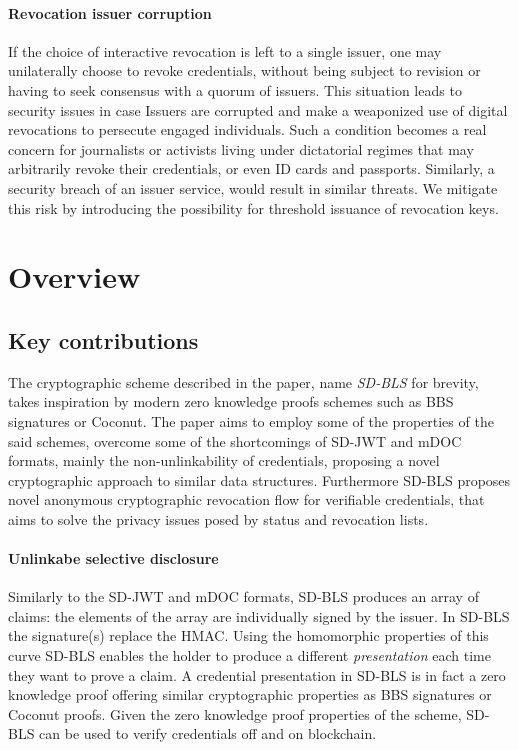 

\paragraph{Revocation issuer corruption}

If the choice of interactive revocation is left to a single issuer, one may unilaterally choose to revoke credentials, without being subject to revision or having to seek consensus with a quorum of issuers. This situation leads to security issues in case Issuers are corrupted and make a weaponized use of digital revocations to persecute engaged individuals. Such a condition becomes a real concern for journalists or activists living under dictatorial regimes that may arbitrarily revoke their credentials, or even ID cards and passports. Similarly, a security breach of an issuer service, would result in similar threats. We mitigate this risk by introducing the possibility for threshold issuance of revocation keys.

\section{Overview}

\subsection{Key contributions}
The  cryptographic scheme described in the paper, name \textit{SD-BLS} for brevity,  takes inspiration by modern zero knowledge proofs schemes  such as \cite{bbs+}BBS signatures or Coconut\cite{coconut}.  The paper aims to employ some of the properties of the said schemes, overcome some of the shortcomings of  SD-JWT and mDOC formats, mainly the non-unlinkability of credentials, proposing a novel cryptographic approach to similar data structures. Furthermore SD-BLS proposes novel anonymous cryptographic revocation flow for verifiable credentials, that aims to solve the privacy issues posed by status and revocation lists.

\paragraph{Unlinkabe selective disclosure}
Similarly to the SD-JWT and mDOC formats, SD-BLS produces an array of claims:  the elements of the array are individually signed by the issuer. In SD-BLS the signature(s) replace the HMAC. Using the homomorphic properties of this curve SD-BLS enables the holder to produce a different \textit{presentation} each time they want to prove a claim. A credential presentation in SD-BLS is in fact a zero knowledge proof offering similar cryptographic properties as \cite{bbs+}BBS signatures or Coconut\cite{coconut} proofs. Given the zero knowledge proof properties of the scheme, SD-BLS can be used to verify credentials off and on blockchain.

